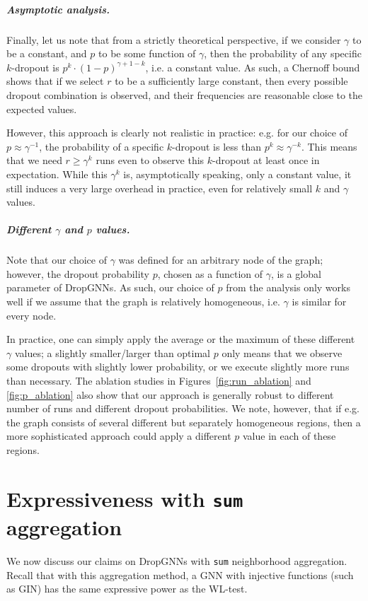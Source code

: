 \documentclass{article}
\begin{document}
\subparagraph*{Asymptotic analysis.} Finally, let us note that from a strictly theoretical perspective, if we consider $\gamma$ to be a constant, and $p$ to be some function of $\gamma$, then the probability of any specific $k$-dropout is $p^k \cdot (1-p)^{\gamma+1-k}$, i.e. a constant value. As such, a Chernoff bound shows that if we select $r$ to be a sufficiently large constant, then every possible dropout combination is observed, and their frequencies are reasonable close to the expected values.

However, this approach is clearly not realistic in practice: e.g. for our choice of $p \approx \gamma^{-1}$, the probability of a specific $k$-dropout is less than $p^k \approx \gamma^{-k}$. This means that we need $r \geq \gamma^k$ runs even to observe this $k$-dropout at least once in expectation. While this $\gamma^k$ is, asymptotically speaking, only a constant value, it still induces a very large overhead in practice, even for relatively small $k$ and $\gamma$ values.

\subparagraph*{Different $\gamma$ and $p$ values.} Note that our choice of $\gamma$ was defined for an arbitrary node of the graph; however, the dropout probability $p$, chosen as a function of $\gamma$, is a global parameter of DropGNNs. As such, our choice of $p$ from the analysis only works well if we assume that the graph is relatively homogeneous, i.e. $\gamma$ is similar for every node.

In practice, one can simply apply the average or the maximum of these different $\gamma$ values; a slightly smaller/larger than optimal $p$ only means that we observe some dropouts with slightly lower probability, or we execute slightly more runs than necessary. The ablation studies in Figures~\ref{fig:run_ablation} and \ref{fig:p_ablation} also show that our approach is generally robust to different number of runs and different dropout probabilities. We note, however, that if e.g. the graph consists of several different but separately homogeneous regions, then a more sophisticated approach could apply a different $p$ value in each of these regions.

\section{Expressiveness with \texttt{sum} aggregation} \label{app:express}

We now discuss our claims on DropGNNs with \texttt{sum} neighborhood aggregation. Recall that with this aggregation method, a GNN with injective functions (such as GIN) has the same expressive power as the WL-test.
\end{document}
